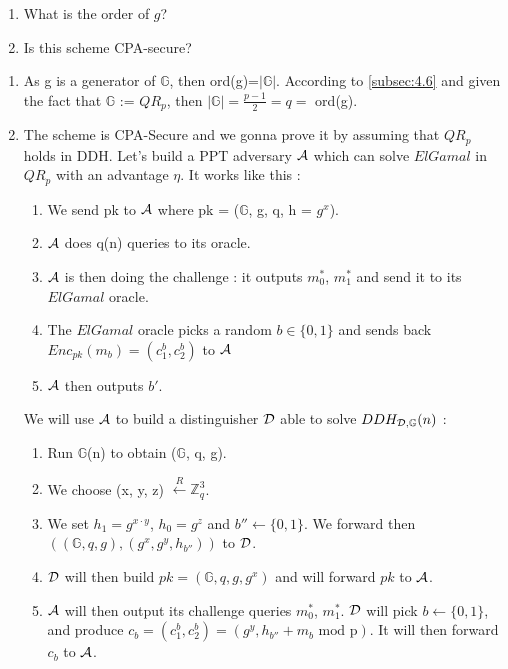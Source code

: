 \begin{enumerate}
	\item What is the order of $g$?
	\item Is this scheme CPA-secure? 

	
\end{enumerate}
\begin{solution}
\begin{enumerate}
    \item As g is a generator of $\mathbb{G}$, then ord(g)=$|\mathbb{G}|$. According to \ref{subsec:4.6} and given the fact that $\mathbb{G}$ := $QR_p$, then $|\mathbb{G}| = \frac{p - 1}{2} = q =$  ord(g).
    \item The scheme is CPA-Secure and we gonna prove it by assuming that $QR_p$ holds in DDH. \newline
    Let's build a PPT adversary $\mathcal{A}$ which can solve $ElGamal$ in $QR_p$ with an advantage $\eta$. It works like this :
    \begin{enumerate}
        \item We send pk to $\mathcal{A}$ where pk = ($\mathbb{G}$, g, q, h = $g^x$).
        \item $\mathcal{A}$ does q(n) queries to its oracle.
        \item $\mathcal{A}$ is then doing the challenge : it outputs $m^*_0$, $m^*_1$ and send it to its $ElGamal$ oracle. 
        \item The $ElGamal$ oracle picks a random $b \in \{0, 1\}$ and sends back $Enc_{pk}(m_b) = (c_1^b, c^b_2)$  to $\mathcal{A}$
        \item $\mathcal{A}$ then outputs $b'$.
    \end{enumerate}
    We will use $\mathcal{A}$ to build a distinguisher $\mathcal{D}$ able to solve $DDH_{\mathcal{D}, \mathbb{G}}(n)$ : 
    \begin{enumerate}
        \item Run $\mathbb{G}$(n) to obtain ($\mathbb{G}$, q, g). 
        \item We choose (x, y, z) $\xleftarrow{R} \mathbb{Z}^3_q$.
        \item We set $h_1 = g^{x \cdot y}$, $h_0 = g^{z}$ and $b'' \leftarrow \{0, 1\}$. We forward then $((\mathbb{G}, q, g), (g^x, g^y, h_{b''}))$ to $\mathcal{D}$.
        \item $\mathcal{D}$ will then build $pk  = (\mathbb{G}, q, g, g^x)$ and will forward $pk$ to $\mathcal{A}$.
        \item $\mathcal{A}$ will then output its challenge queries $m^*_0$, $m^*_1$. $\mathcal{D}$ will pick $b \leftarrow \{0, 1\}$, and produce $c_b = (c_1^b, c^b_2) = (g^y, h_{b''} + m_b \text{ mod p})$. It will then forward $c_b$ to $\mathcal{A}$.

\end{enumerate}
\end{enumerate}
\end{solution}
